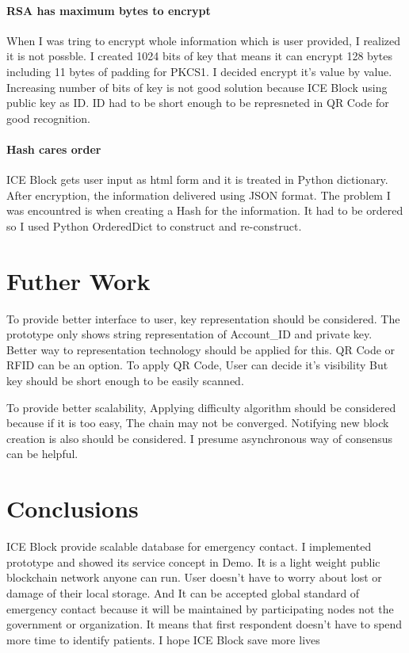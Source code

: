\documentclass[conference]{IEEEtran}
\begin{document}
\paragraph{RSA has maximum bytes to encrypt}
When I was tring to encrypt whole information which is user provided,
I realized it is not possble.\cite{r5} I created 1024 bits of key that means it can encrypt 
128 bytes including 11 bytes of padding for PKCS1.
I decided encrypt it's value by value. Increasing number of bits of key is not good solution because ICE Block using public key as ID.
ID had to be short enough to be represneted in QR Code for good recognition.

\paragraph{Hash cares order}
ICE Block gets user input as html form and it is treated in Python dictionary.
After encryption, the information delivered using JSON format.
The problem I was encountred is when creating a Hash for the information.
It had to be ordered so I used Python OrderedDict to construct and re-construct.

\section{Futher Work}
To provide better interface to user, key representation should be considered.
The prototype only shows string representation of Account\_ID and private key.
Better way to representation technology should be applied for this.
QR Code or RFID can be an option. To apply QR Code, User can decide it's visibility
But key should be short enough to be easily scanned.

To provide better scalability, Applying difficulty algorithm should be considered
because if it is too easy, The chain may not be converged.
Notifying new block creation is also should be considered.
I presume asynchronous way of consensus can be helpful.

\section{Conclusions}
ICE Block provide scalable database for emergency contact.
I implemented prototype and showed its service concept in Demo.
It is a light weight public blockchain network anyone can run.
User doesn’t have to worry about lost or damage of their local storage.
And It can be accepted global standard of emergency contact because it will be maintained by participating nodes not the government or organization.
It means that first respondent doesn't have to spend more time to identify patients.
I hope ICE Block save more lives 
\end{document}
